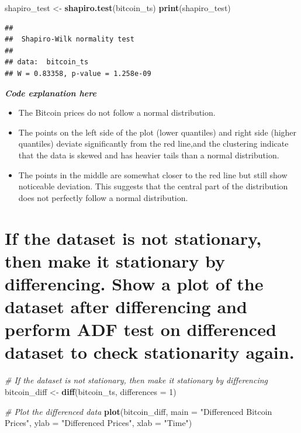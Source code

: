 \documentclass[
]{book}
\newenvironment{Shaded}{\begin{snugshade}}{\end{snugshade}}
\newcommand{\AttributeTok}[1]{\textcolor[rgb]{0.13,0.29,0.53}{#1}}
\newcommand{\CommentTok}[1]{\textcolor[rgb]{0.56,0.35,0.01}{\textit{#1}}}
\newcommand{\DecValTok}[1]{\textcolor[rgb]{0.00,0.00,0.81}{#1}}
\newcommand{\FunctionTok}[1]{\textcolor[rgb]{0.13,0.29,0.53}{\textbf{#1}}}
\newcommand{\NormalTok}[1]{#1}
\newcommand{\OtherTok}[1]{\textcolor[rgb]{0.56,0.35,0.01}{#1}}
\newcommand{\StringTok}[1]{\textcolor[rgb]{0.31,0.60,0.02}{#1}}
\providecommand{\tightlist}{%
  \setlength{\itemsep}{0pt}\setlength{\parskip}{0pt}}
\begin{document}
\begin{Shaded}
\begin{Highlighting}[]
\NormalTok{shapiro\_test }\OtherTok{\textless{}{-}} \FunctionTok{shapiro.test}\NormalTok{(bitcoin\_ts)}
\FunctionTok{print}\NormalTok{(shapiro\_test)}
\end{Highlighting}
\end{Shaded}

\begin{verbatim}
## 
##  Shapiro-Wilk normality test
## 
## data:  bitcoin_ts
## W = 0.83358, p-value = 1.258e-09
\end{verbatim}

\emph{\textbf{Code explanation here}}

\begin{itemize}
\tightlist
\item
  The Bitcoin prices do not follow a normal distribution.
\item
  The points on the left side of the plot (lower quantiles) and right side (higher quantiles) deviate significantly from the red line,and the clustering indicate that the data is skewed and has heavier tails than a normal distribution.
\item
  The points in the middle are somewhat closer to the red line but still show noticeable deviation. This suggests that the central part of the distribution does not perfectly follow a normal distribution.
\end{itemize}

\section{If the dataset is not stationary, then make it stationary by differencing. Show a plot of the dataset after differencing and perform ADF test on differenced dataset to check stationarity again.}\label{if-the-dataset-is-not-stationary-then-make-it-stationary-by-differencing.-show-a-plot-of-the-dataset-after-differencing-and-perform-adf-test-on-differenced-dataset-to-check-stationarity-again.}

\begin{Shaded}
\begin{Highlighting}[]
\CommentTok{\# If the dataset is not stationary, then make it stationary by differencing}
\NormalTok{bitcoin\_diff }\OtherTok{\textless{}{-}} \FunctionTok{diff}\NormalTok{(bitcoin\_ts, }\AttributeTok{differences =} \DecValTok{1}\NormalTok{)}

\CommentTok{\# Plot the differenced data}
\FunctionTok{plot}\NormalTok{(bitcoin\_diff, }\AttributeTok{main =} \StringTok{"Differenced Bitcoin Prices"}\NormalTok{, }\AttributeTok{ylab =} \StringTok{"Differenced Prices"}\NormalTok{, }\AttributeTok{xlab =} \StringTok{"Time"}\NormalTok{)}
\end{Highlighting}
\end{Shaded}
\end{document}
